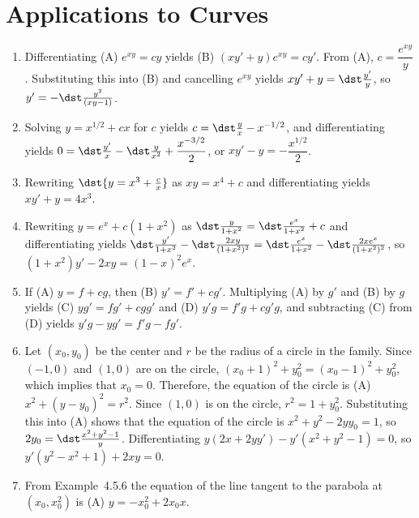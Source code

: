 \documentclass[openany]{book}
\newenvironment{sectionSolutions}{
 \begin{enumerate}[item-label={\thesection.\arabic{enumi}.}]
}{
 \end{enumerate}
}
\begin{document}
\section{Applications to Curves}

\begin{sectionSolutions}
\item
Differentiating (A) $e^{xy}=cy$ yields (B) $(xy'+y)e^{xy}=cy'$. From
(A), $c=\dfrac{e^{xy}}{ y}$. Substituting this into (B) and
cancelling $e^{xy}$ yields $xy'+y=\dst\frac{y'}{ y}$, so
$y'=-\dst\frac{y^2}{(xy-1)}$.

\item
Solving $y=x^{1/2}+cx$ for $c$ yields $c=\dst\frac{y}{ x}-x^{-1/2}$, and
differentiating yields $0=\dst\frac{y'}{ x}-\dst\frac{y}{
x^2}+\dfrac{x^{-3/2}}{2}$, or $xy'-y=-\dfrac{x^{1/2}}{2}$.


\item
Rewriting $\dst{y=x^3+\frac{c}{ x}}$ as $xy=x^4+c$ and differentiating
yields $xy'+y=4x^3$.


\item
Rewriting $y=e^x+c(1+x^2)$ as
$\dst\frac{y}{1+x^2}=\dst\frac{e^x}{1+x^2}+c$ and differentiating yields
$\dst\frac{y'}{1+x^2}-\dst\frac{2xy}{(1+x^2)^2}=
\dst\frac{e^x}{1+x^2}-\dst\frac{2xe^x}{(1+x^2)^2}$, so
$(1+x^2)y'-2xy=(1-x)^2e^x$.


\item
If (A) $y=f+cg$, then (B) $y'=f'+cg'$. Multiplying (A) by $g'$
and (B) by $g$ yields
(C) $yg'=fg'+cgg'$ and  (D) $y'g=f'g+c g'g$, and subtracting (C)
from (D) yields
$y'g-yg'=f'g-fg'$.


\item Let $(x_0,y_0)$ be the center
and $r$ be the radius of a circle in the family. Since $(-1,0)$ and
$(1,0)$ are on the circle, $(x_0+1)^2+y_0^2=(x_0-1)^2+y_0^2$, which
implies that $x_0=0$. Therefore, the equation of the circle is (A)
$x^2+(y-y_0)^2=r^2$. Since $(1,0)$ is on the circle, $r^2=1+y_0^2$.
Substituting this into (A) shows that the equation of the circle is
$x^2+y^2-2yy_0=1$, so $2y_0=\dst\frac{x^2+y^2-1}{ y}$. Differentiating
$y(2x+2yy')-y'(x^2+y^2-1)=0$, so $y'(y^2-x^2+1)+2xy=0$.


\item
From Example~4.5.6 the equation of the line tangent to the
parabola at $(x_0,x_0^2)$ is (A) $y=-x_0^2+2x_0x$.

\end{sectionSolutions}
\end{document}
